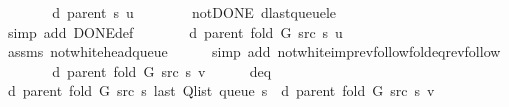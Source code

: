 \begin{isabellebody}
\ \ \isamarkupfalse%
\ \isamarkupfalse%
\ {\isachardoublequoteopen}{\isachardot}{\kern0pt}{\isachardot}{\kern0pt}{\isachardot}{\kern0pt}\ {\isasymle}\ d\ {\isacharparenleft}{\kern0pt}parent\ s{\isacharparenright}{\kern0pt}\ {\isacharquery}{\kern0pt}u\ {\isacharplus}{\kern0pt}\ {}{\isachardoublequoteclose}\isanewline
\ \ \ \ \isamarkupfalse%
\ not{\isacharunderscore}{\kern0pt}DONE\ d{\isacharunderscore}{\kern0pt}last{\isacharunderscore}{\kern0pt}queue{\isacharunderscore}{\kern0pt}le\isanewline
\ \ \ \ \isamarkupfalse%
\ {\isacharparenleft}{\kern0pt}simp\ add{\isacharcolon}{\kern0pt}\ DONE{\isacharunderscore}{\kern0pt}def{\isacharparenright}{\kern0pt}\isanewline
\ \ \isamarkupfalse%
\ \isamarkupfalse%
\ {\isachardoublequoteopen}{\isachardot}{\kern0pt}{\isachardot}{\kern0pt}{\isachardot}{\kern0pt}\ {\isacharequal}{\kern0pt}\ d\ {\isacharparenleft}{\kern0pt}parent\ {\isacharparenleft}{\kern0pt}fold\ G\ src\ s{\isacharparenright}{\kern0pt}{\isacharparenright}{\kern0pt}\ {\isacharquery}{\kern0pt}u\ {\isacharplus}{\kern0pt}\ {}{\isachardoublequoteclose}\isanewline
\ \ \ \ \isamarkupfalse%
\ assms\ not{\isacharunderscore}{\kern0pt}white{\isacharunderscore}{\kern0pt}head{\isacharunderscore}{\kern0pt}queue\isanewline
\ \ \ \ \isamarkupfalse%
\ {\isacharparenleft}{\kern0pt}simp\ add{\isacharcolon}{\kern0pt}\ not{\isacharunderscore}{\kern0pt}white{\isacharunderscore}{\kern0pt}imp{\isacharunderscore}{\kern0pt}rev{\isacharunderscore}{\kern0pt}follow{\isacharunderscore}{\kern0pt}fold{\isacharunderscore}{\kern0pt}eq{\isacharunderscore}{\kern0pt}rev{\isacharunderscore}{\kern0pt}follow{\isacharparenright}{\kern0pt}\isanewline
\ \ \isamarkupfalse%
\ \isamarkupfalse%
\ {\isachardoublequoteopen}{\isachardot}{\kern0pt}{\isachardot}{\kern0pt}{\isachardot}{\kern0pt}\ {\isacharequal}{\kern0pt}\ d\ {\isacharparenleft}{\kern0pt}parent\ {\isacharparenleft}{\kern0pt}fold\ G\ src\ s{\isacharparenright}{\kern0pt}{\isacharparenright}{\kern0pt}\ v{\isachardoublequoteclose}\isanewline
\ \ \ \ \isamarkupfalse%
\ d{\isacharunderscore}{\kern0pt}eq\isanewline
\ \ \ \ \isacommand{{\isachardot}{\kern0pt}{\isachardot}{\kern0pt}}\isamarkupfalse%
\isanewline
\ \ \isamarkupfalse%
\ \isamarkupfalse%
\ {\isachardoublequoteopen}d\ {\isacharparenleft}{\kern0pt}parent\ {\isacharparenleft}{\kern0pt}fold\ G\ src\ s{\isacharparenright}{\kern0pt}{\isacharparenright}{\kern0pt}\ {\isacharparenleft}{\kern0pt}last\ {\isacharparenleft}{\kern0pt}Q{\isacharunderscore}{\kern0pt}list\ {\isacharparenleft}{\kern0pt}queue\ s{\isacharparenright}{\kern0pt}{\isacharparenright}{\kern0pt}{\isacharparenright}{\kern0pt}\ {\isasymle}\ d\ {\isacharparenleft}{\kern0pt}parent\ {\isacharparenleft}{\kern0pt}fold\ G\ src\ s{\isacharparenright}{\kern0pt}{\isacharparenright}{\kern0pt}\ v{\isachardoublequoteclose}\isanewline

\end{isabellebody}
